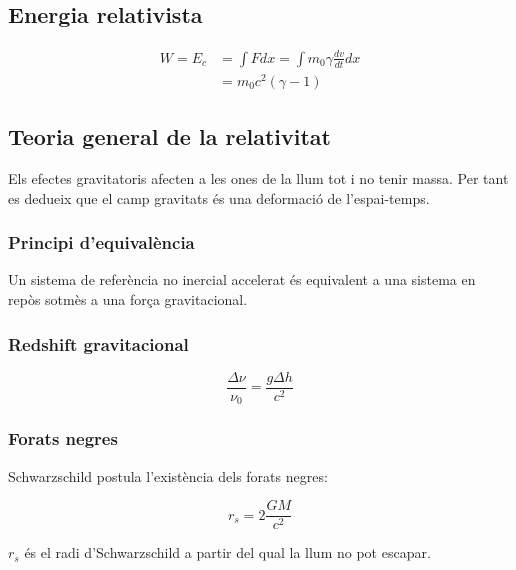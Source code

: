 \subsection{Energia relativista}
\label{sub:energia_relativista}

\begin{align}
    W = E_c &= \int F dx = \int m_0 \gamma \frac{dv}{dt}dx \\
    &= m_0c^2(\gamma -1)
\end{align}

\pagebreak

\subsection{Teoria general de la relativitat}
\label{sub:teoria_general_de_la_relativitat}

Els efectes gravitatoris afecten a les ones de la llum tot i no tenir massa.
Per tant es dedueix que el camp gravitats és una deformació de l'espai-temps.

\subsubsection{Principi d'equivalència}
\label{ssub:principi_d_equivalencia}

Un sistema de referència no inercial accelerat és equivalent a una sistema en
repòs sotmès a una força gravitacional.

\subsubsection{Redshift gravitacional}
\label{ssub:redshift_gravitacional}

\begin{equation}
    \frac{\Delta \nu}{\nu_0} = \frac{g\Delta h}{c^2}
\end{equation}

\subsubsection{Forats negres}
\label{ssub:forats_negres}

Schwarzschild postula l'existència dels forats negres:

\begin{equation}
    r_s = 2\frac{GM}{c^2}
\end{equation}

$r_s$ és el radi d'Schwarzschild a partir del qual la llum no pot escapar.

